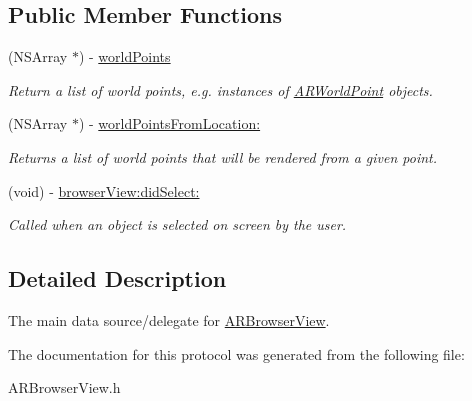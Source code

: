 \subsection*{Public Member Functions}
\begin{DoxyCompactItemize}
\item 
\hypertarget{protocol_a_r_browser_view_delegate-p_a52ee75fc0a19b24f804419fc3ab6df43}{(N\-S\-Array $\ast$) -\/ \hyperlink{protocol_a_r_browser_view_delegate-p_a52ee75fc0a19b24f804419fc3ab6df43}{world\-Points}}\label{protocol_a_r_browser_view_delegate-p_a52ee75fc0a19b24f804419fc3ab6df43}

\begin{DoxyCompactList}\small\item\em Return a list of world points, e.\-g. instances of \hyperlink{interface_a_r_world_point}{A\-R\-World\-Point} objects. \end{DoxyCompactList}\item 
\hypertarget{protocol_a_r_browser_view_delegate-p_ac0d859e925ae6768eb28fb1d946becc0}{(N\-S\-Array $\ast$) -\/ \hyperlink{protocol_a_r_browser_view_delegate-p_ac0d859e925ae6768eb28fb1d946becc0}{world\-Points\-From\-Location\-:}}\label{protocol_a_r_browser_view_delegate-p_ac0d859e925ae6768eb28fb1d946becc0}

\begin{DoxyCompactList}\small\item\em Returns a list of world points that will be rendered from a given point. \end{DoxyCompactList}\item 
\hypertarget{protocol_a_r_browser_view_delegate-p_a1cde6bfffaa5d319ce04954867fe909f}{(void) -\/ \hyperlink{protocol_a_r_browser_view_delegate-p_a1cde6bfffaa5d319ce04954867fe909f}{browser\-View\-:did\-Select\-:}}\label{protocol_a_r_browser_view_delegate-p_a1cde6bfffaa5d319ce04954867fe909f}

\begin{DoxyCompactList}\small\item\em Called when an object is selected on screen by the user. \end{DoxyCompactList}\end{DoxyCompactItemize}


\subsection{Detailed Description}
The main data source/delegate for \hyperlink{interface_a_r_browser_view}{A\-R\-Browser\-View}. 

The documentation for this protocol was generated from the following file\-:\begin{DoxyCompactItemize}
\item 
A\-R\-Browser\-View.\-h\end{DoxyCompactItemize}
